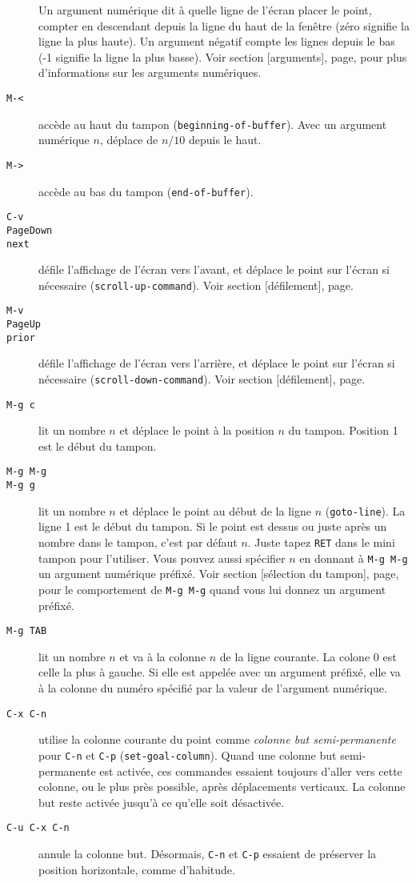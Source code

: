 \begin{description}
  Un argument numérique dit à quelle ligne de l'écran placer le point,
  compter en descendant depuis la ligne du haut de la fenêtre (zéro
  signifie la ligne la plus haute). Un argument négatif compte les
  lignes depuis le bas (-1 signifie la ligne la plus basse). Voir
  section [arguments], page, pour plus
  d'informations sur les arguments numériques.
\item[\texttt{M-<}] accède au haut du tampon
  (\texttt{beginning-of-buffer}). Avec un argument numérique $n$,
  déplace de $n/10$ depuis le haut.
\item[\texttt{M->}] accède au bas du tampon (\texttt{end-of-buffer}). 
\item[\texttt{C-v}]
\item[\texttt{PageDown}]
\item[\texttt{next}] défile l'affichage de l'écran vers l'avant, et
  déplace le point sur l'écran si nécessaire
  (\texttt{scroll-up-command}). Voir section
  [défilement], page.
\item[\texttt{M-v}]
\item[\texttt{PageUp}]
\item[\texttt{prior}] défile l'affichage de l'écran vers l'arrière, et
  déplace le point sur l'écran si nécessaire
  (\texttt{scroll-down-command}). Voir section
  [défilement], page.
\item[\texttt{M-g c}] lit un nombre $n$ et déplace le point à la
  position $n$ du tampon. Position 1 est le début du tampon.
\item[\texttt{M-g M-g}]
\item[\texttt{M-g g}] lit un nombre $n$ et déplace le point au début
  de la ligne $n$ (\texttt{goto-line}). La ligne 1 est le début du
  tampon. Si le point est dessus ou juste après un nombre dans le
  tampon, c'est par défaut $n$. Juste tapez \texttt{RET} dans le mini
  tampon pour l'utiliser. Vous pouvez aussi spécifier $n$ en donnant à
  \texttt{M-g M-g} un argument numérique préfixé. Voir
  section [sélection du tampon], page, pour
  le comportement de \texttt{M-g M-g} quand vous lui donnez un
  argument préfixé.
\item[\texttt{M-g TAB}] lit un nombre $n$ et va à la colonne $n$ de la
  ligne courante. La colone 0 est celle la plus à gauche. Si elle est
  appelée avec un argument préfixé, elle va à la colonne du numéro
  spécifié par la valeur de l'argument numérique.
\item[\texttt{C-x C-n}] utilise la colonne courante du point comme
  \emph{colonne but semi-permanente} pour \texttt{C-n} et \texttt{C-p}
  (\texttt{set-goal-column}). Quand une colonne but semi-permanente
  est activée, ces commandes essaient toujours d'aller vers cette
  colonne, ou le plus près possible, après déplacements verticaux. La
  colonne but reste activée jusqu'à ce qu'elle soit désactivée.
\item[\texttt{C-u C-x C-n}] annule la colonne but. Désormais,
  \texttt{C-n} et \texttt{C-p} essaient de préserver la position
  horizontale, comme d'habitude.
\end{description}

